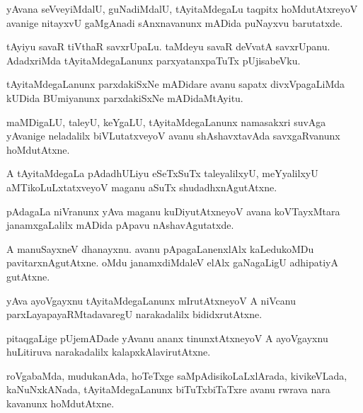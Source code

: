 \documentclass{article}
\begin{document}
\begin{mng}%
yAvana seVveyiMdalU, guNadiMdalU, tAyitaMdegaLu taqpitx
hoMdutAtxreyoV avanige nitayxvU gaMgAnadi sAnxnavanunx mADida puNayxvu
barutatxde.
\end{mng}

\begin{mng}%
tAyiyu savaR tiVthaR savxrUpaLu. taMdeyu savaR deVvatA
savxrUpanu. AdadxriMda tAyitaMdegaLanunx parxyatanxpaTuTx pUjisabeVku.
\end{mng}

\begin{mng}%
tAyitaMdegaLanunx parxdakiSxNe mADidare avanu sapatx divxVpagaLiMda
kUDida BUmiyanunx parxdakiSxNe mADidaMtAyitu.
\end{mng}

\begin{mng}%
maMDigaLU, taleyU, keYgaLU, tAyitaMdegaLanunx namasakxri
suvAga yAvanige neladalilx biVLutatxveyoV avanu shAshavxtavAda savxgaRvanunx
hoMdutAtxne.
\end{mng}

\begin{mng}%
A tAyitaMdegaLa pAdadhULiyu eSeTxSuTx taleyalilxyU,
meYyalilxyU aMTikoLuLxtatxveyoV maganu aSuTx shudadhxnAgutAtxne.
\end{mng}

\begin{mng}%
pAdagaLa niVranunx yAva maganu kuDiyutAtxneyoV avana 
koVTayxMtara janamxgaLalilx mADida pApavu nAshavAgutatxde.
\end{mng}

\begin{mng}%
A manuSayxneV dhanayxnu. avanu pApagaLanenxlAlx kaLedukoMDu
pavitarxnAgutAtxne. oMdu janamxdiMdaleV elAlx gaNagaLigU adhipatiyA
gutAtxne.
\end{mng}

\begin{mng}%
yAva ayoVgayxnu tAyitaMdegaLanunx mIrutAtxneyoV A
niVcanu parxLayapayaRMtadavaregU narakadalilx bididxrutAtxne.
\end{mng}

\begin{mng}%
pitaqgaLige pUjemADade yAvanu ananx tinunxtAtxneyoV A
ayoVgayxnu huLitiruva narakadalilx kalapxkAlavirutAtxne.
\end{mng}

\begin{mng}%
roVgabaMda, mudukanAda, hoTeTxge saMpAdisikoLaLxlArada, 
kivikeVLada, kaNuNxkANada, tAyitaMdegaLanunx biTuTxbiTaTxre avanu rwrava nara
kavanunx hoMdutAtxne.
\end{mng}
\end{document}
